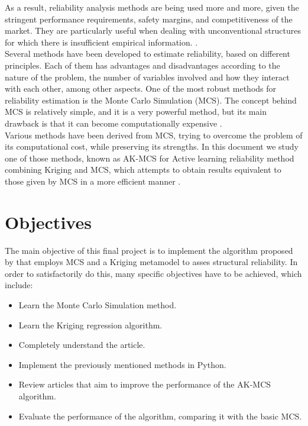 As a result, reliability analysis methods are being used more and more, given the stringent performance requirements, safety margins, and competitiveness of the market. They are particularly useful when dealing with unconventional structures for which there is insufficient empirical information. \citep{Choi2006}. \\

Several methods have been developed to estimate reliability, based on different principles. Each of them has advantages and disadvantages according to the nature of the problem, the number of variables involved and how they interact with each other, among other aspects. One of the most robust methods for reliability estimation is the Monte Carlo Simulation (MCS). The concept behind MCS is relatively simple, and it is a very powerful method, but its main drawback is that it can become computationally expensive \citep{Nowak2000}. \\

Various methods have been derived from MCS, trying to overcome the problem of
its computational cost, while preserving its strengths. In this document we study
one of those methods, known as AK-MCS for Active learning reliability method combining
Kriging and MCS, which attempts to obtain results equivalent to those given by MCS in a 
more efficient manner \citep{Echard2011}.

\section{Objectives}
The main objective of this final project is to implement the algorithm proposed by \citep{Echard2011} that employs MCS and a Kriging
metamodel to asses structural reliability. In order to satisfactorily do this, many
specific objectives have to be achieved, which include:
\begin{itemize}
    \item Learn the Monte Carlo Simulation method.
    \item Learn the Kriging regression algorithm.
    \item Completely understand the article.
    \item Implement the previously mentioned methods in Python.
    \item Review articles that aim to improve the performance of the AK-MCS algorithm.
    \item Evaluate the performance of the algorithm, comparing it with the basic MCS.
\end{itemize}

